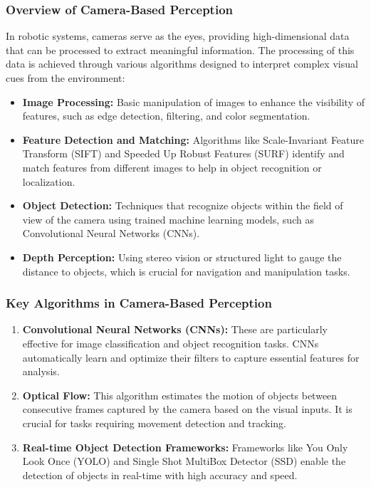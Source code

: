 \documentclass{article}
\begin{document}
	\subsubsection{Overview of Camera-Based Perception}
	In robotic systems, cameras serve as the eyes, providing high-dimensional data that can be processed to extract meaningful information. The processing of this data is achieved through various algorithms designed to interpret complex visual cues from the environment:
	\begin{itemize}
		\item \textbf{Image Processing:} Basic manipulation of images to enhance the visibility of features, such as edge detection, filtering, and color segmentation.
		\item \textbf{Feature Detection and Matching:} Algorithms like Scale-Invariant Feature Transform (SIFT) and Speeded Up Robust Features (SURF) identify and match features from different images to help in object recognition or localization.
		\item \textbf{Object Detection:} Techniques that recognize objects within the field of view of the camera using trained machine learning models, such as Convolutional Neural Networks (CNNs).
		\item \textbf{Depth Perception:} Using stereo vision or structured light to gauge the distance to objects, which is crucial for navigation and manipulation tasks.
	\end{itemize}
	
	\subsubsection{Key Algorithms in Camera-Based Perception}
	\begin{enumerate}
		\item \textbf{Convolutional Neural Networks (CNNs):} These are particularly effective for image classification and object recognition tasks. CNNs automatically learn and optimize their filters to capture essential features for analysis.
		\item \textbf{Optical Flow:} This algorithm estimates the motion of objects between consecutive frames captured by the camera based on the visual inputs. It is crucial for tasks requiring movement detection and tracking.
		\item \textbf{Real-time Object Detection Frameworks:} Frameworks like You Only Look Once (YOLO) and Single Shot MultiBox Detector (SSD) enable the detection of objects in real-time with high accuracy and speed.
	\end{enumerate}
	
\end{document}
